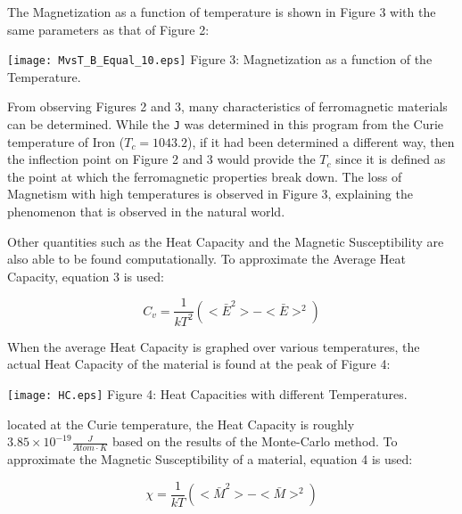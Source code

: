 \documentclass{article}
\begin{document}
\begin{multicols}{2}
The Magnetization as a function of temperature is shown in Figure 3 with the same parameters as that of Figure 2:

\begin{center}
\texttt{[image: MvsT\_B\_Equal\_10.eps]}
\scriptsize{
Figure 3: Magnetization as a function of the Temperature.
}
\end{center}

From observing Figures 2 and 3, many characteristics of ferromagnetic materials can be determined. While the \verb!J! was determined in this program from the Curie temperature of Iron ($T_c = 1043.2$), if it had been determined a different way, then the inflection point on Figure 2 and 3 would provide the $T_c$ since it is defined as the point at which the ferromagnetic properties break down. The loss of Magnetism with high temperatures is observed in Figure 3, explaining the phenomenon that is observed in the natural world. 

Other quantities such as the Heat Capacity and the Magnetic Susceptibility are also able to be found computationally. To approximate the Average Heat Capacity, equation 3 is used:

\begin{equation}
    \label{equation3}
    C_v = \frac{1}{kT^2} \left(<\bar{E}^2> - <\bar{E}>^2\right)
\end{equation}

\vspace{0.1in}

When the average Heat Capacity is graphed over various temperatures, the actual Heat Capacity of the material is found at the peak of Figure 4:

\begin{center}
\texttt{[image: HC.eps]}
\scriptsize{
Figure 4: Heat Capacities with different Temperatures.
}
\end{center}

located at the Curie temperature, the Heat Capacity is roughly $3.85\times 10^{-19} \frac{J}{Atom \cdot K}$ based on the results of the Monte-Carlo method. To approximate the Magnetic Susceptibility of a material, equation 4 is used:

\begin{equation}
    \label{equation4}
    \chi = \frac{1}{kT}\left(<\bar{M}^2> - <\bar{M}>^2\right) 
\end{equation}

\vspace{0.1in}


\end{multicols}
\end{document}
